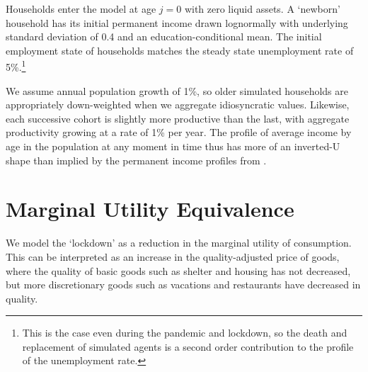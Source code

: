 \documentclass[./ConsumptionResponse]{subfiles}
\begin{document}
Households enter the model at age $j=0$ with zero liquid assets.
A `newborn' household has its initial permanent income drawn lognormally with underlying standard deviation of 0.4 and an education-conditional mean.
The initial employment state of households matches the steady state unemployment rate of 5\%.\footnote{This is the case even during the pandemic and lockdown, so the death and replacement of simulated agents is a second order contribution to the profile of the unemployment rate.}

We assume annual population growth of 1\%, so older simulated households are appropriately down-weighted when we aggregate idiosyncratic values.
Likewise, each successive cohort is slightly more productive than the last, with aggregate productivity growing at a rate of 1\% per year.
The profile of average income by age in the population at any moment in time thus has more of an inverted-U shape than implied by the permanent income profiles from \cite{Cagetti}.

\section{Marginal Utility Equivalence} \label{mu_equivalency}
We model the `lockdown' as a reduction in the marginal utility of consumption.
This can be interpreted as an increase in the quality-adjusted price of goods, where the quality of basic goods such as shelter and housing has not decreased, but more discretionary goods such as vacations and restaurants have decreased in quality.
\end{document}
